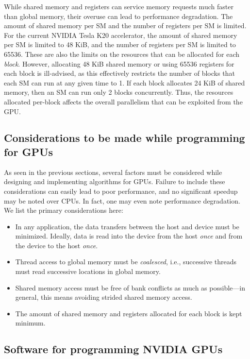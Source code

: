 While shared memory and registers can service memory requests
much faster than global memory,
their overuse can lead to performance degradation.
The amount of shared memory per SM
and the number of registers per SM is limited.
For the current NVIDIA Tesla K20 accelerator,
the amount of shared memory per SM is limited to 48 KiB,
and the number of registers per SM is limited to 65536.
These are also the limits
on the resources that can be allocated for each \emph{block}.
However,
allocating 48 KiB shared memory or using 65536 registers 
for each block is ill-advised,
as this effectively restricts the number of blocks that
each SM can run at any given time to 1.
If each block allocates 24 KiB of shared memory,
then an SM can run only 2 blocks concurrently.
Thus, the resources allocated per-block affects
the overall parallelism that can be exploited from the GPU.

\subsection{Considerations to be made while programming for GPUs}

As seen in the previous sections,
several factors must be considered while
designing and implementing algorithms for GPUs.
Failure to include these considerations can easily
lead to poor performance,
and no significant speedup may be noted over CPUs.
In fact, one may even note performance degradation.
We list the primary considerations here:

\begin{itemize}
    \item In any application, the data transfers between
        the host and device must be minimized.
        Ideally,
        data is read into the device from the host \emph{once}
        and from the device to the host \emph{once}.
    \item Thread access to global memory must be \emph{coalesced},
        i.e., successive threads must read successive locations
        in global memory.
    \item Shared memory access must be free of bank conflicts
        as much as possible---in general, this means avoiding
        strided shared memory access.
    \item The amount of shared memory and registers
        allocated for each block is kept minimum.
\end{itemize}

\subsection{Software for programming NVIDIA GPUs}

